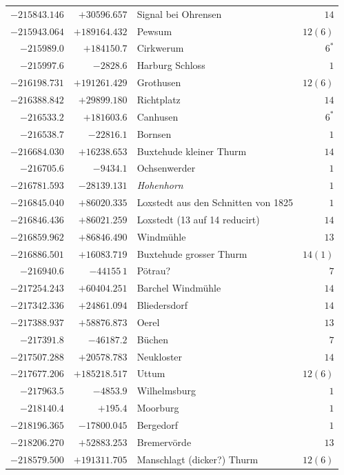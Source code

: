 \begin{center}
\begin{tabular}{r|r|p{170pt}|r}
\(-215843.146\)&\(+30596.657\)&Signal bei Ohrensen&\(14\)\\
\(-215943.064\)&\(+189164.432\)&Pewsum&\(12 (6)\)\\
\(-215989.0\)&\(+184150.7\)&Cirkwerum&\(6^{*}\)\\
\(-215997.6\)&\(-2828.6\)&Harburg Schloss&\(1\)\\
\(-216198.731\)&\(+191261.429\)&Grothusen&\(12 (6)\)\\
\(-216388.842\)&\(+29899.180\)&Richtplatz&\(14\)\\
\(-216533.2\)&\(+181603.6\)&Canhusen&\(6^{*}\)\\
\(-216538.7\)&\(-22816.1\)&Bornsen&\(1\)\\
\(-216684.030\)&\(+16238.653\)&Buxtehude kleiner Thurm&\(14\)\\
\(-216705.6\)&\(-9434.1\)&Ochsenwerder&\(1\)\\
\(-216781.593\)&\(-28139.131\)&\textit{Hohenhorn}&\(1\)\\
\(-216845.040\)&\(+86020.335\)&Loxstedt aus den Schnitten von 1825&\(1\)\\
\(-216846.436\)&\(+86021.259\)&Loxstedt (13 auf 14 reducirt)&\(14\)\\
\(-216859.962\)&\(+86846.490\)&Windmühle&\(13\)\\
\(-216886.501\)&\(+16083.719\)&Buxtehude grosser Thurm&\(14 (1)\)\\
\(-216940.6\)&\(-44155\,1\)&Pötrau?&\(7\)\\
\(-217254.243\)&\(+60404.251\)&Barchel Windmühle&\(14\)\\
\(-217342.336\)&\(+24861.094\)&Bliedersdorf&\(14\)\\
\(-217388.937\)&\(+58876.873\)&Oerel&\(13\)\\
\(-217391.8\)&\(-46187.2\)&Büchen&\(7\)\\
\(-217507.288\)&\(+20578.783\)&Neukloster&\(14\)\\
\(-217677.206\)&\(+185218.517\)&Uttum&\(12 (6)\)\\
\(-217963.5\)&\(-4853.9\)&Wilhelmsburg&\(1\)\\
\(-218140.4\)&\(+195.4\)&Moorburg&\(1\)\\
\(-218196.365\)&\(-17800.045\)&Bergedorf&\(1\)\\
\(-218206.270\)&\(+52883.253\)&Bremervörde&\(13\)\\
\(-218579.500\)&\(+191311.705\)&Manschlagt (dicker?) Thurm&\(12 (6)\)\\
\hline\end{tabular}\endgroup\end{center}
